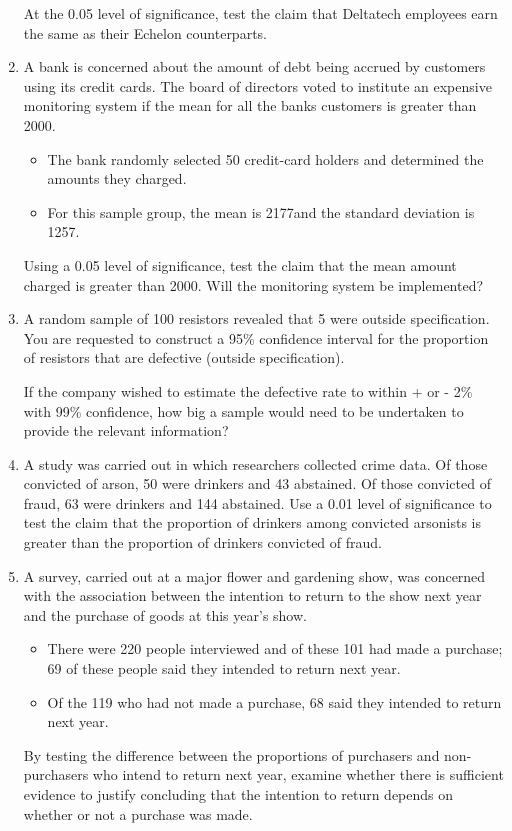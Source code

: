 \documentclass[a4paper,12pt]{article}
\begin{document}
\begin{enumerate}
 At the 0.05 level of significance, test the claim that Deltatech employees earn the same as their  Echelon counterparts.
 
 
 \item  A bank is concerned about the amount of debt being accrued by customers using its credit
 cards. The board of directors voted to institute an expensive monitoring system if the mean for all the banks customers is greater than 2000.
 \begin{itemize}
 	\item The bank randomly selected 50 credit-card holders and
 	determined the amounts they charged. 
 	\item For this sample group, the mean is 2177and the standard	deviation is  1257. 
 \end{itemize}
  Using a 0.05 level of significance, test the claim that the mean amount charged
 is greater than 2000. Will the monitoring system be implemented?
 
 
 \item A random sample of 100 resistors revealed that 5 were outside specification.  You are requested to construct a 95\% confidence interval for the proportion of resistors that are defective (outside specification).
 
 If the company wished to estimate the defective rate to within + or - 2\% with 99\% confidence, how big a sample would need to be undertaken to provide the relevant information?

 
 
 \item A study was carried out in which researchers collected crime data. Of those convicted of
 arson, 50 were drinkers and 43 abstained. Of those convicted of fraud, 63 were drinkers and 144
 abstained. Use a 0.01 level of significance to test the claim that the proportion of drinkers among
 convicted arsonists is greater than the proportion of drinkers convicted of fraud.
 

\item 
A survey, carried out at a major flower and gardening show, was concerned with the association between the intention to return to the show next year and the purchase of goods at this year's show.
\begin{itemize}
	\item There were 220 people interviewed and of these 101 had made a purchase; 69 of these people said they intended to return next year. 
	\item Of the 119 who had not made a purchase, 68 said they intended to return next year.
\end{itemize}
By testing the difference between the proportions of purchasers and non-purchasers who intend to return next year, examine whether there is sufficient evidence to justify concluding that the intention to return depends on whether or not a purchase was made.


\end{enumerate}
\end{document}
